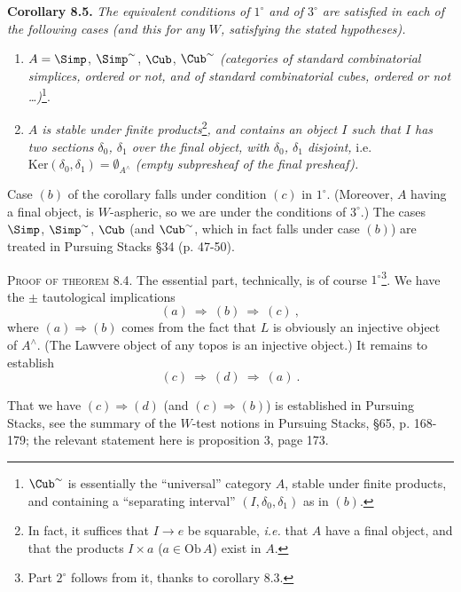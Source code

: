 \textbf{Corollary 8.5.} \textit{The equivalent conditions of $1^\circ$ and of $3^\circ$ are satisfied in each of the following cases (and this for any $W$, satisfying the stated hypotheses).}
\begin{enumerate}[leftmargin=2.5em]
\item[a)] $A = \Simp$, $\Simp^{\sim}$, $\Cub$, $\Cub^{\sim}$ \textit{(categories of standard combinatorial simplices, ordered or not, and of standard combinatorial cubes, ordered or not \ldots)}\footnote[39]{$\Cub^{\sim}$ is essentially the ``universal'' category $A$, stable under finite products, and containing a ``separating interval'' $(I,\delta_0,\delta_1)$ as in $(b)$.}.
\item[b)] \textit{$A$ is stable under finite products}\footnote[40]{In fact, it suffices that $I \longrightarrow e$ be squarable, \textit{i.e.} that $A$ have a final object, and that the products $I \times a$ ($a \in \mathrm{Ob}\,A$) exist in $A$.}\textit{, and contains an object $I$ such that $I$ has two sections $\delta_0$, $\delta_1$ over the final object, with $\delta_0$, $\delta_1$ disjoint,} i.e. $\mathrm{Ker}(\delta_0,\delta_1) = \emptyset_{A^\wedge}$ \textit{(empty subpresheaf of the final presheaf).}
\end{enumerate}


Case $(b)$ of the corollary falls under condition $(c)$ in $1^\circ$. (Moreover, $A$ having a final object, is $W$-aspheric, so we are under the conditions of $3^\circ$.) The cases $\Simp$, $\Simp^{\sim}$, $\Cub$ (and $\Cub^{\sim}$, which in fact falls under case $(b)$) are treated in Pursuing Stacks \S34 (p. 47-50).

\textsc{Proof of theorem} 8.4. The essential part, technically, is of course $1^\circ$\footnote[41]{Part $2^\circ$ follows from it, thanks to corollary 8.3.}. We have the $\pm$ tautological implications
\[
(a) \ \Longrightarrow\ (b) \ \Longrightarrow\ (c)\ ,
\]
where $(a) \Longrightarrow (b)$ comes from the fact that $L$ is obviously an injective object of $A^\wedge$. (The Lawvere object of any topos is an injective object.) It remains to establish
\[
(c) \ \Longrightarrow\ (d) \ \Longrightarrow\ (a)\ .
\]


That we have $(c) \Longrightarrow (d)$ (and $(c) \Longrightarrow (b)$) is established in Pursuing Stacks, see the summary of the $W$-test notions in Pursuing Stacks, \S65, p. 168-179; the relevant statement here is proposition 3, page 173.

